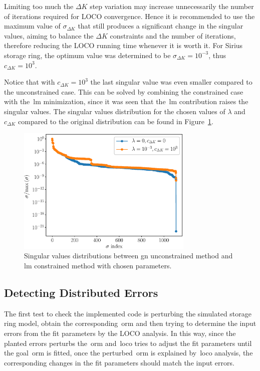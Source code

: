 Limiting too much the $\Delta K$ step variation may increase unnecessarily the number of iterations required for LOCO convergence. Hence it is recommended to use the maximum value of $\sigma_{\Delta K}$ that still produces a significant change in the singular values, aiming to balance the $\Delta K$ constraints and the number of iterations, therefore reducing the LOCO running time whenever it is worth it. For Sirius storage ring, the optimum value was determined to be $\sigma_{\Delta K} = 10^{-3}$, thus $c_{\Delta K} = 10^{3}$.

Notice that with $c_{\Delta K}=10^{3}$ the last singular value was even smaller compared to the unconstrained case. This can be solved by combining the constrained case with the~\gls{lm} minimization, since it was seen that the~\gls{lm} contribution raises the singular values. The singular values distribution for the chosen values of $\lambda$ and $c_{\Delta K}$ compared to the original distribution can be found in Figure~\ref{fig:compare_svs}.
\begin{figure}
\centering
\includegraphics[width=0.75\textwidth]{figures/sing_vals_chosen.eps}
\caption{Singular values distributions between \gls{gn} unconstrained method and \gls{lm} constrained method with chosen parameters.}
\label{fig:compare_svs}
\end{figure}

\subsection{Detecting Distributed Errors}
The first test to check the implemented code is perturbing the simulated storage ring model, obtain the corresponding~\gls{orm} and then trying to determine the input errors from the fit parameters by the LOCO analysis. In this way, since the planted errors perturbs the~\gls{orm} and~\gls{loco} tries to adjust the fit parameters until the goal~\gls{orm} is fitted, once the perturbed~\gls{orm} is explained by~\gls{loco} analysis, the corresponding changes in the fit parameters should match the input errors. 

